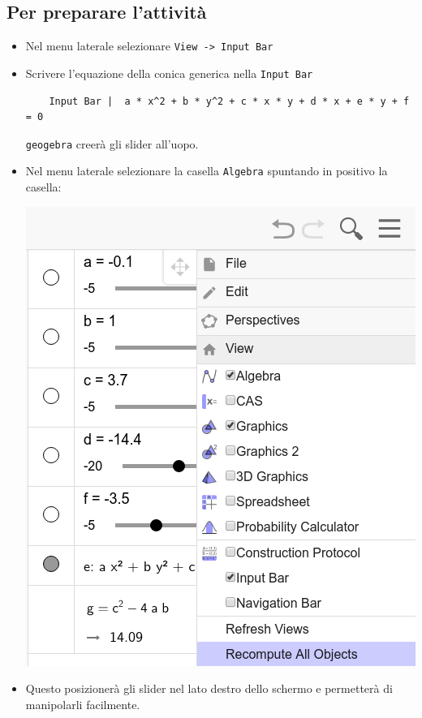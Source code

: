 \documentclass{amsart}
\begin{document}
\subsection{Per preparare l'attività}
\begin{itemize}
  \item Nel menu laterale selezionare {\tt View -> Input Bar}
  \item Scrivere l'equazione della conica generica nella {\tt Input Bar}
  \begin{verbatim}
    Input Bar |  a * x^2 + b * y^2 + c * x * y + d * x + e * y + f = 0
  \end{verbatim}
  {\tt geogebra} creerà gli slider all'uopo.
  \item Nel menu laterale selezionare la casella {\tt Algebra} spuntando in positivo la casella:
  \begin{center}
    \includegraphics[scale=.2]{menubar.png}
  \end{center}
  \item Questo posizionerà gli slider nel lato destro dello schermo e permetterà di manipolarli facilmente.
\end{itemize}
\end{document}
